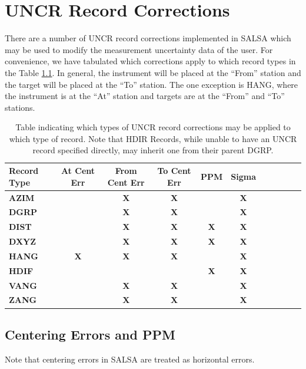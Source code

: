\chapter{UNCR Record Corrections}
\label{chap:UNCRcorrections}
There are a number of UNCR record corrections implemented in SALSA which may be used to modify the measurement uncertainty data of the user.  For convenience, we have tabulated which corrections apply to which record types in the Table \ref{tab:UNCRcorrections}.  In general, the instrument will be placed at the ``From'' station and the target will be placed at the ``To'' station.  The one exception is HANG, where the instrument is at the ``At'' station and targets are at the ``From'' and ``To'' stations.

\begin{table}[!htbp]
\centering
\begin{tabular}{|l|c|c|c|c|c|c|c|c|c|c|}\hline
\tiny{\textbf{Record Type}}&\tiny{\textbf{At Cent Err}}&\tiny{\textbf{From Cent Err}}&\tiny{\textbf{To Cent Err}}&\tiny{\textbf{PPM}}&\tiny{\textbf{Sigma}}\\\hline
\tiny{\textbf{AZIM}}&&\tiny{\textbf{X}}&\tiny{\textbf{X}}&&\tiny{\textbf{X}}\\\hline
\tiny{\textbf{DGRP}}&&\tiny{\textbf{X}}&\tiny{\textbf{X}}&&\tiny{\textbf{X}}\\\hline
\tiny{\textbf{DIST}}&&\tiny{\textbf{X}}&\tiny{\textbf{X}}&\tiny{\textbf{X}}&\tiny{\textbf{X}}\\\hline
\tiny{\textbf{DXYZ}}&&\tiny{\textbf{X}}&\tiny{\textbf{X}}&\tiny{\textbf{X}}&\tiny{\textbf{X}}\\\hline
\tiny{\textbf{HANG}}&\tiny{\textbf{X}}&\tiny{\textbf{X}}&\tiny{\textbf{X}}&&\tiny{\textbf{X}}\\\hline
\tiny{\textbf{HDIF}}&&&&\tiny{\textbf{X}}&\tiny{\textbf{X}}\\\hline
\tiny{\textbf{VANG}}&&\tiny{\textbf{X}}&\tiny{\textbf{X}}&&\tiny{\textbf{X}}\\\hline
\tiny{\textbf{ZANG}}&&\tiny{\textbf{X}}&\tiny{\textbf{X}}&&\tiny{\textbf{X}}\\\hline
\end{tabular}
\caption{Table indicating which types of UNCR record corrections may be applied to which type of record.  Note that HDIR Records, while unable to have an UNCR record specified directly, may inherit one from their parent DGRP.}
\label{tab:UNCRcorrections}
\end{table}

\section{Centering Errors and PPM}
Note that centering errors in SALSA are treated as horizontal errors.
